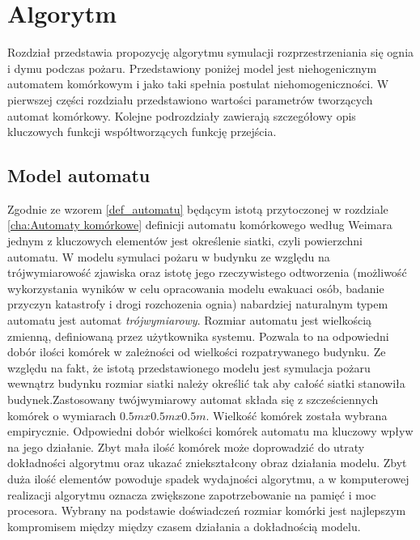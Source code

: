 ﻿%
\chapter{Algorytm}
\label{cha:Algorytm}
Rozdział przedstawia propozycję algorytmu symulacji rozprzestrzeniania się ognia i dymu podczas pożaru.
Przedstawiony poniżej model jest niehogenicznym automatem komórkowym i jako taki spełnia postulat niehomogeniczności.
W pierwszej części rozdziału przedstawiono wartości parametrów tworzących automat komórkowy. Kolejne podrozdziały 
zawierają szczegółowy opis kluczowych funkcji współtworzących funkcję przejścia.
\section {Model automatu}
Zgodnie ze wzorem \ref{def_automatu} będącym istotą przytoczonej w rozdziale \ref{cha:Automaty komórkowe} definicji automatu komórkowego według Weimara jednym z kluczowych elementów jest określenie siatki, czyli powierzchni automatu. W modelu symulaci pożaru w budynku
ze względu na trójwymiarowość zjawiska oraz istotę jego rzeczywistego odtworzenia (możliwość wykorzystania wyników w celu
opracowania modelu ewakuaci osób, badanie przyczyn katastrofy i drogi rozchozenia ognia) nabardziej naturalnym typem automatu 
jest automat \textsl {trójwymiarowy}. 
Rozmiar automatu jest wielkością zmienną, definiowaną przez użytkownika systemu. Pozwala to na odpowiedni dobór ilości komórek w zależności od wielkości rozpatrywanego budynku. Ze względu na fakt, że istotą przedstawionego modelu jest symulacja pożaru wewnątrz budynku rozmiar siatki należy określić tak aby całość
siatki stanowiła budynek.Zastosowany twójwymiarowy automat składa się z szcześciennych komórek o wymiarach $0.5m x 0.5m x 0.5m$. Wielkość komórek została wybrana empirycznie. 
Odpowiedni dobór wielkości komórek automatu ma kluczowy wpływ na jego działanie. Zbyt mała ilość komórek może doprowadzić do utraty
dokładności algorytmu oraz ukazać zniekształcony obraz działania modelu. Zbyt duża ilość elementów powoduje spadek wydajności algorytmu, a w komputerowej realizacji algorytmu oznacza zwiększone zapotrzebowanie na pamięć i moc procesora.
Wybrany na podstawie doświadczeń rozmiar komórki jest najlepszym
kompromisem między między czasem działania a dokładnością modelu.


